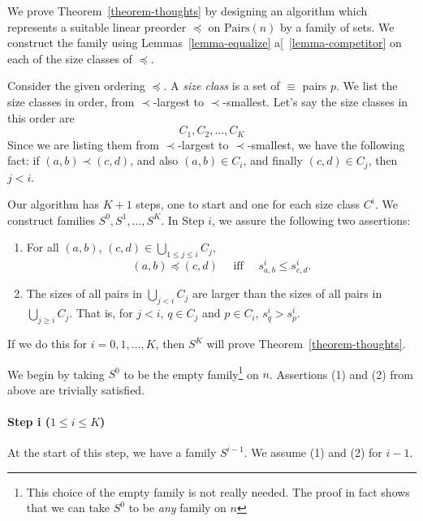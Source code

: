 \documentclass[12pt]{article}
\theoremstyle{definition}
\newcommand{\quadiff}{\quad \mbox{ iff } \quad}
\newcommand{\Pairs}{\mbox{Pairs}}
\begin{document}
We prove Theorem~\ref{theorem-thoughts} by designing an algorithm
which represents a suitable linear preorder $\preceq$ on $\Pairs(n)$ by a family
of sets.   We construct the family using Lemmas~\ref{lemma-equalize}
a[~\ref{lemma-competitor} on each of the 
size classes of $\preceq$.


Consider the given ordering $\preceq$.
A \emph{size class} is a set of $\equiv$
 pairs $p$.   We list the size classes in order, from $\prec$-largest to 
 $\prec$-smallest.   Let's say the size classes in this order are 
 \[  C_1, C_2, \ldots, C_K \]
 Since we are listing them from 
 $\prec$-largest to 
 $\prec$-smallest, we have the following fact:
 if $(a,b) \prec (c,d)$, and also  $(a,b)\in C_i$, and finally
 $(c,d)\in C_j$,
 then $j < i$.
 
 Our algorithm has $K+1$ steps, one to start
 and one for each size class $C^i$. 
 We construct families $S^0, S^1, \ldots, S^K$.
 In Step $i$,
 we assure the following two assertions:
 \begin{enumerate}
 \item For all $(a,b)$, $(c,d)\in \bigcup_{1\leq j\leq i} C_j$,
\begin{equation}
    \label{goal-in-alg}
 (a,b) \preceq  (c,d) \quadiff 
 s^i_{a,b}\leq s^i_{c,d}.
 \end{equation}
     \item 
The sizes of all pairs in $\bigcup_{j< i} C_j$ are larger than the sizes of all pairs in $\bigcup_{j\geq i} C_j$.
   That is, for  $j < i$, $q\in C_j$ and $p\in C_i$, $s^i_q > s^i_p$.
 \end{enumerate}
 If we do this for $i = 0, 1, \ldots, K$, then $S^K$ will
 prove Theorem~\ref{theorem-thoughts}.
 
 We begin by taking $S^0$ to be the empty family\footnote{This
 choice of the empty family is not really needed.
 The proof in fact shows that we can take $S^0$ to be \emph{any}
 family on $n$}   on $n$.
 Assertions (1) and (2) from above are trivially satisfied.
 
 \paragraph{Step i ($1 \leq i \leq K$)}
 At the start of this step, we have a family $S^{i-1}$.
 We assume (1) and (2) for $i -1$.
 
\end{document}
